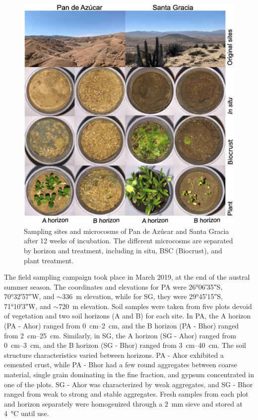 \begin{figure}[H]
	\centering
	\includegraphics[width=1\textwidth]{img/M3-Figure_1.jpg}
	\caption{Sampling sites and microcosms of Pan de Azúcar and Santa Gracia after 12 weeks of incubation. The different microcosms are separated by horizon and treatment, including in situ, BSC (Biocrust), and plant treatment.}
	\label{fig:M3-F1}
\end{figure}

The field sampling campaign took place in March 2019, at the end of the austral summer season. The coordinates and elevations for PA were \ang{26;06;35}S, \ang{70;32;57}W, and \(\sim\)\SI{336}{\meter} elevation, while for SG, they were \ang{29;45;15}S, \ang{71;10;3}W, and \(\sim\)\SI{720}{\meter} elevation. Soil samples were taken from five plots devoid of vegetation and two soil horizons (A and B) for each site. In PA, the A horizon (PA - Ahor) ranged from \SIrange{0}{2}{\centi\metre}, and the B horizon (PA - Bhor) ranged from \SIrange{2}{25}{\centi\metre}. Similarly, in SG, the A horizon (SG - Ahor) ranged from \SIrange{0}{3}{\centi\metre}, and the B horizon (SG - Bhor) ranged from \SIrange{3}{40}{\centi\metre}. The soil structure characteristics varied between horizons. PA - Ahor exhibited a cemented crust, while PA - Bhor had a few round aggregates between coarse material, single grain dominating in the fine fraction, and gypsum concentrated in one of the plots. SG - Ahor was characterized by weak aggregates, and SG - Bhor ranged from weak to strong and stable aggregates. Fresh samples from each plot and horizon separately were homogenized through a \SI{2}{\milli\metre} sieve and stored at \SI{4}{\degreeCelsius} until use.

